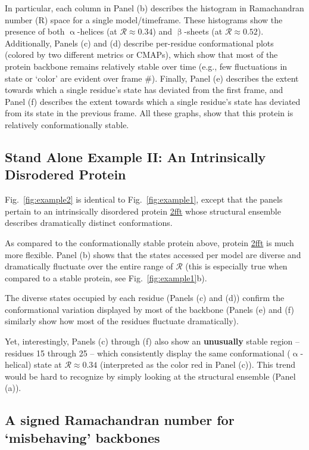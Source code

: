 \documentclass[fleqn,10pt,lineno]{wlpeerj} %
\newcommand{\Fig}[1]{Fig.~\ref{#1}}
\newcommand{\n}[1]{{\textbf{\color{red}#1}}}
\begin{document}
In particular, each column in Panel (b) describes the histogram in Ramachandran number (R) space for a single model/timeframe. These histograms show the presence of both $\upalpha$-helices (at $\mathcal{R} \approx 0.34$) and $\upbeta$-sheets (at $\mathcal{R} \approx 0.52$). Additionally, Panels (c) and (d) describe per-residue conformational plots (colored by two different metrics or CMAPs), which show that most of the protein backbone remains relatively stable over time (e.g., few fluctuations in state or `color' are evident over frame \#). Finally, Panel (e) describes the extent towards which a single residue's state has deviated from the first frame, and Panel (f) describes the extent towards which a single residue's state has deviated from its state in the previous frame. All these graphs, show that this protein is relatively conformationally stable.

\subsection*{Stand Alone Example II: An Intrinsically Disrodered Protein}

\Fig{fig:example2} is identical to \Fig{fig:example1}, except that the panels pertain to an intrinsically disordered protein \href{https://www.rcsb.org/structure/2FFT}{2fft} whose structural ensemble describes dramatically distinct conformations. 

As compared to the conformationally stable protein above, protein \href{https://www.rcsb.org/structure/2FFT}{2fft} is much more flexible. Panel (b) shows that the states accessed per model are diverse and dramatically fluctuate over the entire range of $\mathcal{R}$ (this is especially true when compared to a stable protein, see \Fig{fig:example1}b). 

The diverse states occupied by each residue (Panels (c) and (d)) confirm the conformational variation displayed by most of the backbone (Panels (e) and (f) similarly show how most of the residues fluctuate dramatically).

Yet, interestingly, Panels (c) through (f) also show an \n{unusually} stable region -- residues 15 through 25 -- which consistently display the same conformational ($\upalpha$-helical) state at $\mathcal{R}\approx0.34$ (interpreted as the color red in Panel (c)). This trend would be hard to recognize by simply looking at the structural ensemble (Panel (a)). 

\subsection*{A signed Ramachandran number for `misbehaving' backbones}
\end{document}
